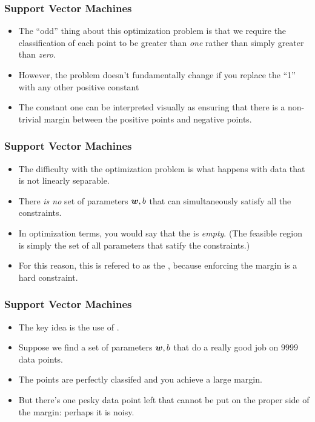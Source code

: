 \documentclass[trans]{beamer}
\begin{document}
\begin{frame}
  \frametitle{Support Vector Machines}
\begin{itemize}
\item 
The ``odd'' thing about this optimization problem is that we require
the classification of each point to be greater than \emph{one} rather
than simply greater than \emph{zero}.  
\item However, the problem doesn't
fundamentally change if you replace the ``1'' with any other positive
constant
\item The constant one can be interpreted
visually as ensuring that there is a non-trivial margin between the
positive points and negative points.
\end{itemize}
\end{frame}
\begin{frame}
  \frametitle{Support Vector Machines}
\begin{itemize}
\item 
The difficulty with the optimization problem is what happens with data that is not
linearly separable.  
\item There \emph{is no} set of
parameters ${\boldsymbol{w}},b$ that can simultaneously satisfy all the
constraints.
\item   In optimization terms, you would say that the
 is \emph{empty}.  (The feasible region is
simply the set of all parameters that satify the constraints.)  
\item For
this reason, this is refered to as the ,
because enforcing the margin is a hard constraint. 
\end{itemize}
\end{frame}
\begin{frame}
  \frametitle{Support Vector Machines}
\begin{itemize}
\item 
The key idea is the use of .  
\item Suppose we find a set of
parameters ${\boldsymbol{w}},b$ that do a really good job on $9999$ data points.
\item The points are perfectly classifed and you achieve a large margin.
\item But there's one pesky data point left that cannot be put on the proper
side of the margin: perhaps it is noisy. 
\end{itemize}
\end{frame}
\end{document}
